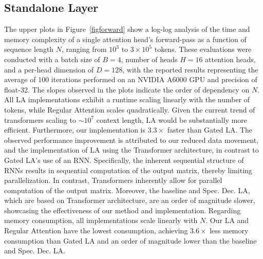 \subsection{Standalone Layer}
\label{exp:forward}
The upper plots in Figure~\ref{figforward} show a log-log analysis of the time and memory complexity of a single attention head's forward-pass as a function of sequence length $N$, ranging from $10^3$ to $3×10^5$ tokens. These evaluations were conducted with a batch size of $B=4$, number of heads $H=16$ attention heads, and a per-head dimension of $D=128$, with the reported results representing the average of 100 iterations performed on an NVIDIA A6000 GPU and precision of float-32. The slopes observed in the plots indicate the order of dependency on $N$. All LA implementations exhibit a runtime scaling linearly with the number of tokens, while Regular Attention scales quadratically. Given the current trend of transformers scaling to $\sim 10^7$ context length, LA would be substantially more efficient. Furthermore, our implementation is $3.3\times$ faster than Gated LA. The observed performance improvement is attributed to our reduced data movement, and the implementation of LA using the Transformer architecture, in contrast to Gated LA's use of an RNN. Specifically, the inherent sequential structure of RNNs results in sequential computation of the output matrix, thereby limiting parallelization. In contrast, Transformers inherently allow for parallel computation of the output matrix. Moreover, the baseline and Spec. Dec. LA, which are based on Transformer architecture, are an order of magnitude slower, showcasing the effectiveness of our method and implementation. Regarding memory consumption, all implementations scale linearly with $N$. Our LA and Regular Attention have the lowest consumption, achieving $3.6\times$ less memory consumption than Gated LA and an order of magnitude lower than the baseline and Spec. Dec. LA.

